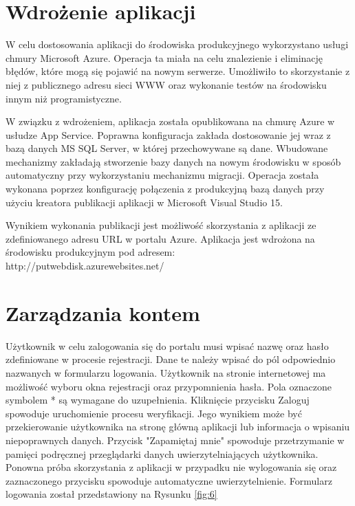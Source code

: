 \section{Wdrożenie aplikacji}

W celu dostosowania aplikacji do środowiska produkcyjnego wykorzystano usługi chmury Microsoft Azure. Operacja ta miała na celu znalezienie i eliminację błędów, które mogą się pojawić na nowym serwerze. Umożliwiło to skorzystanie z niej z publicznego adresu sieci WWW oraz wykonanie testów na środowisku innym niż programistyczne. 


W związku z wdrożeniem, aplikacja została opublikowana na chmurę Azure w usłudze App Service\cite{MicrosoftAzureAppService}. Poprawna konfiguracja zakłada dostosowanie jej wraz z bazą danych MS SQL Server\cite{MicrosoftSQLServer}, w której przechowywane są dane. Wbudowane mechanizmy zakładają stworzenie bazy danych na nowym środowisku w sposób automatyczny przy wykorzystaniu mechanizmu migracji. Operacja została wykonana poprzez konfigurację połączenia z produkcyjną bazą danych przy użyciu kreatora publikacji aplikacji w Microsoft Visual Studio 15.  

Wynikiem wykonania publikacji jest możliwość skorzystania z aplikacji ze zdefiniowanego adresu URL w portalu Azure. Aplikacja jest wdrożona na środowisku produkcyjnym pod adresem: 
\\
http://putwebdisk.azurewebsites.net/

\section{Zarządzania kontem}

Użytkownik w celu zalogowania się do portalu musi wpisać nazwę oraz hasło zdefiniowane w procesie rejestracji. Dane te należy wpisać do pól odpowiednio nazwanych w formularzu logowania. Użytkownik na stronie internetowej ma możliwość wyboru okna rejestracji oraz przypomnienia hasła. Pola oznaczone symbolem * są wymagane do uzupełnienia. Kliknięcie przycisku Zaloguj spowoduje uruchomienie procesu weryfikacji. Jego wynikiem może być przekierowanie użytkownika na stronę główną aplikacji lub informacja o wpisaniu niepoprawnych danych. Przycisk "Zapamiętaj mnie" spowoduje przetrzymanie w pamięci podręcznej przeglądarki danych uwierzytelniających użytkownika. Ponowna próba skorzystania z aplikacji w przypadku nie wylogowania się oraz zaznaczonego przycisku spowoduje automatyczne uwierzytelnienie. Formularz logowania został przedstawiony na Rysunku \ref{fig:6}

